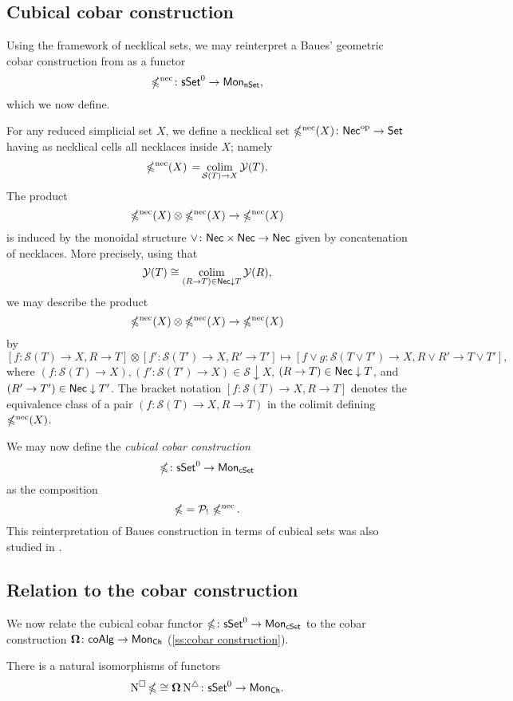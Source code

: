 \subsection{Cubical cobar construction} \label{ss:cubical cobar}

Using the framework of necklical sets, we may reinterpret a Baues' geometric cobar construction from \cite{baues1998hopf} as a functor
\[
\operatorname{\mathbb{\Omega}^{\mathrm{nec}}} \colon \mathsf{sSet}^0 \to \mathsf{Mon}_{\mathsf{nSet}},
\]
which we now define.

For any reduced simplicial set $X$, we define a necklical set $\operatorname{\mathbb{\Omega}^{\mathrm{nec}}}(X) \colon \mathsf{Nec}^{\mathrm{op}} \to \mathsf{Set}$ having as necklical cells all necklaces inside $X$; namely
\[
\operatorname{\mathbb{\Omega}^{\mathrm{nec}}}(X) \, = \! \operatorname*{colim}_{\mathcal{S}(T) \to X} \mathcal{Y}(T).
\]
The product
\[
\operatorname{\mathbb{\Omega}^{\mathrm{nec}}}(X) \otimes \operatorname{\mathbb{\Omega}^{\mathrm{nec}}}(X) \to \operatorname{\mathbb{\Omega}^{\mathrm{nec}}}(X)
\]
is induced by the monoidal structure $\vee \colon \mathsf{Nec} \times \mathsf{Nec} \to \mathsf{Nec}$ given by concatenation of necklaces.
More precisely, using that
\[
\mathcal{Y}(T) \cong \operatorname*{colim}_{(R \to T) \in \mathsf{Nec} \downarrow T} \mathcal{Y}(R),
\]
we may describe the product
\[
\operatorname{\mathbb{\Omega}^{\mathrm{nec}}}(X) \otimes \operatorname{\mathbb{\Omega}^{\mathrm{nec}}}(X) \to \operatorname{\mathbb{\Omega}^{\mathrm{nec}}}(X)
\]
by
\[
[f\colon \mathcal{S}(T) \to X, R \to T] \otimes [f'\colon \mathcal{S}(T') \to X, R' \to T'] \mapsto [f \vee g\colon \mathcal{S}(T\vee T') \to X, R \vee R'\to T \vee T'],
\]
where $(f\colon \mathcal{S}(T) \to X), (f'\colon \mathcal{S}(T') \to X) \in \mathcal{S} \downarrow X$, $ (R\to T) \in \mathsf{Nec} \downarrow T$, and $(R' \to T') \in \mathsf{Nec} \downarrow T'$.
The bracket notation $[f\colon \mathcal{S}(T) \to X, R\to T]$ denotes the equivalence class of a pair $(f \colon \mathcal{S}(T) \to X, R \to T)$ in the colimit defining $\operatorname{\mathbb{\Omega}^{\mathrm{nec}}}(X)$.

We may now define the \textit{cubical cobar construction}
\[
\operatorname{\mathbb{\Omega}} \colon \mathsf{sSet}^0 \to \mathsf{Mon}_{\mathsf{cSet}}
\]
as the composition
\[
\operatorname{\mathbb{\Omega}} = \mathcal{P}_! \, \operatorname{\mathbb{\Omega}^{\mathrm{nec}}}.
\]
This reinterpretation of Baues construction in terms of cubical sets was also studied in \cite{rivera2018cubical}.

\subsection{Relation to the cobar construction}

We now relate the cubical cobar functor $\operatorname{\mathbb{\Omega}} \colon \mathsf{sSet}^0 \to \mathsf{Mon}_{\mathsf{cSet}}$ to the cobar construction $\operatorname{\mathbf{\Omega}} \colon \mathsf{coAlg} \to \mathsf{Mon}_{\mathsf{Ch}}$ (\cref{ss:cobar construction}).

\begin{lemma} \label{l:ccobar and cobar}
	There is a natural isomorphisms of functors
	\[
	\operatorname{N^{\square}} \operatorname{\mathbb{\Omega}} \cong \operatorname{\mathbf{\Omega}} \operatorname{N^{\triangle}} \colon \mathsf{sSet}^0 \to \mathsf{Mon}_{\mathsf{Ch}}.
	\]
\end{lemma}

